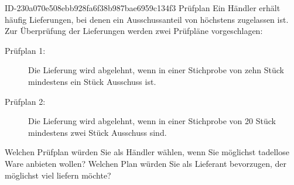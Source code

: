 \begin{exercise}
      {ID-230a070e508ebb928fa6f38b987bae6959c134f3}
      {Prüfplan}
  \ifproblem\problem
    Ein Händler erhält häufig Lieferungen, bei denen ein Ausschussanteil von
    höchstens  zugelassen ist. Zur Überprüfung der Lieferungen werden
    zwei Prüfpläne vorgeschlagen:
    \begin{description}
      \item[Prüfplan 1:]
           Die Lieferung wird abgelehnt, wenn in einer Stichprobe von zehn
           Stück mindestens ein Stück Ausschuss ist.
      \item[Prüfplan 2:]
           Die Lieferung wird abgelehnt, wenn in einer Stichprobe von 20
           Stück mindestens zwei Stück Ausschuss sind.
    \end{description}
    Welchen Prüfplan würden Sie als Händler wählen, wenn Sie möglichst
    tadellose Ware anbieten wollen? Welchen Plan würden Sie als Lieferant
    bevorzugen, der möglichst viel liefern möchte?
  \fi
\end{exercise}
